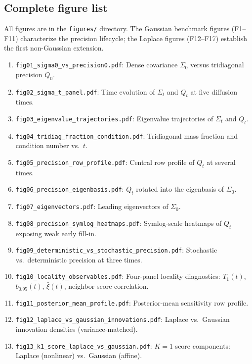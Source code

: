\documentclass[11pt,a4paper]{article}
\theoremstyle{plain}
\theoremstyle{definition}
\newcommand{\Sig}{\Sigma}
\newcommand{\Prec}{Q}
\begin{document}
\subsection{Complete figure list}

All figures are in the \texttt{figures/} directory. The Gaussian benchmark figures (F1--F11) characterize the precision lifecycle; the Laplace figures (F12--F17) establish the first non-Gaussian extension.

\begin{enumerate}
\item[\textbf{F1.}] \texttt{fig01\_sigma0\_vs\_precision0.pdf}: Dense covariance $\Sig_0$ versus tridiagonal precision $\Prec_0$.
\item[\textbf{F2.}] \texttt{fig02\_sigma\_t\_panel.pdf}: Time evolution of $\Sig_t$ and $\Prec_t$ at five diffusion times.
\item[\textbf{F3.}] \texttt{fig03\_eigenvalue\_trajectories.pdf}: Eigenvalue trajectories of $\Sig_t$ and $\Prec_t$.
\item[\textbf{F4.}] \texttt{fig04\_tridiag\_fraction\_condition.pdf}: Tridiagonal mass fraction and condition number vs.\ $t$.
\item[\textbf{F5.}] \texttt{fig05\_precision\_row\_profile.pdf}: Central row profile of $\Prec_t$ at several times.
\item[\textbf{F6.}] \texttt{fig06\_precision\_eigenbasis.pdf}: $\Prec_t$ rotated into the eigenbasis of $\Sig_0$.
\item[\textbf{F7.}] \texttt{fig07\_eigenvectors.pdf}: Leading eigenvectors of $\Sig_0$.
\item[\textbf{F8.}] \texttt{fig08\_precision\_symlog\_heatmaps.pdf}: Symlog-scale heatmaps of $\Prec_t$ exposing weak early fill-in.
\item[\textbf{F9.}] \texttt{fig09\_deterministic\_vs\_stochastic\_precision.pdf}: Stochastic vs.\ deterministic precision at three times.
\item[\textbf{F10.}] \texttt{fig10\_locality\_observables.pdf}: Four-panel locality diagnostics: $T_1(t)$, $b_{0.95}(t)$, $\bar{\xi}(t)$, neighbor score correlation.
\item[\textbf{F11.}] \texttt{fig11\_posterior\_mean\_profile.pdf}: Posterior-mean sensitivity row profile.
\item[\textbf{F12.}] \texttt{fig12\_laplace\_vs\_gaussian\_innovations.pdf}: Laplace vs.\ Gaussian innovation densities (variance-matched).
\item[\textbf{F13.}] \texttt{fig13\_k1\_score\_laplace\_vs\_gaussian.pdf}: $K\!=\!1$ score components: Laplace (nonlinear) vs.\ Gaussian (affine).

\end{enumerate}
\end{document}

